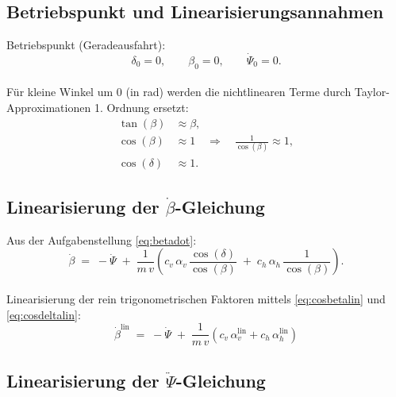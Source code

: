
\subsection{Betriebspunkt und Linearisierungsannahmen}
Betriebspunkt (Geradeausfahrt):
\begin{equation*}
\delta_0 = 0,\qquad \beta_0 = 0,\qquad \dot{\Psi}_0 = 0.
\end{equation*}
\\
Für kleine Winkel um $0$ (in rad) werden die nichtlinearen Terme durch Taylor-Approximationen 1. Ordnung ersetzt:
\begin{align}
\tan(\beta) &\approx \beta, \label{eq:tanlin}\\
\cos(\beta) &\approx 1 \quad \Rightarrow \quad \frac{1}{\cos(\beta)} \approx 1, \label{eq:cosbetalin}\\
\cos(\delta) &\approx 1. \label{eq:cosdeltalin}
\end{align}

\subsection{Linearisierung der \texorpdfstring{$\dot{\beta}$}{beta-dot}-Gleichung}

Aus der Aufgabenstellung \eqref{eq:betadot}:
\begin{equation*}
\dot{\beta} \;=\; -\dot{\Psi} \;+\; \frac{1}{m\,v}
\left(
c_v\,\alpha_v\,\frac{\cos(\delta)}{\cos(\beta)} \;+\;
c_h\,\alpha_h\,\frac{1}{\cos(\beta)}
\right).
\end{equation*}
\\
Linearisierung der rein trigonometrischen Faktoren mittels \eqref{eq:cosbetalin} und \eqref{eq:cosdeltalin}:
\begin{equation}
\boxed{
\dot{\beta}^{\mathrm{lin}}
\;=\;
-\dot{\Psi}
\;+\;
\frac{1}{m\,v}
\left(
c_v\,\alpha_v^{\mathrm{lin}}
+
c_h\,\alpha_h^{\mathrm{lin}}
\right)
}
\end{equation}

\subsection{Linearisierung der \texorpdfstring{$\ddot{\Psi}$}{Psi-ddot}-Gleichung}

